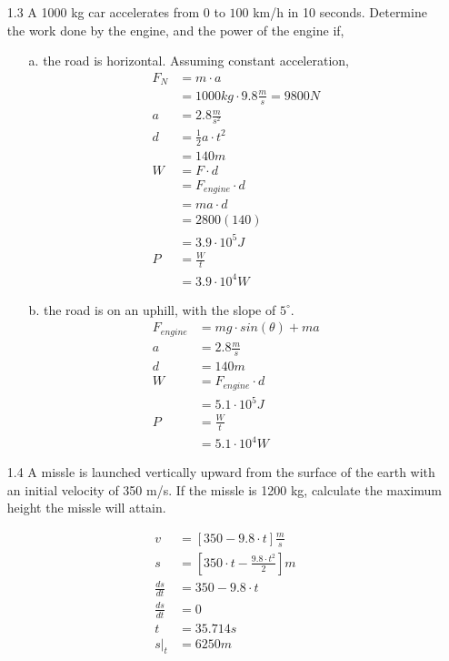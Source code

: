 \documentclass[10pt, a4paper]{article}
\begin{document}
\begin{enumerate}
  \item[1.3] A 1000 kg car accelerates from 0 to $100$ km/h in 10 seconds. Determine the work done by the engine, and the power of the engine if,
    \begin{enumerate}
      \item[a.] the road is horizontal. Assuming constant acceleration,
        \begin{align}
         F_N &= m \cdot a \\
         &= 1000kg \cdot 9.8\frac{m}{s} = 9800 N \\
         a &= 2.8\frac{m}{s^2} \\
         d &= \frac{1}{2}a\cdot t^2 \\
           &= 140 m \\
         W &= F \cdot d \\
           &= F_{engine} \cdot d \\
           &= ma \cdot d \\
           &= 2800(140) \\
           &= 3.9 \cdot 10^5 J \\
         P &= \frac{W}{t} \\
           &= 3.9 \cdot 10^{4} W
       \end{align}

       \setcounter{equation}{0}

      \item[b.] the road is on an uphill, with the slope of $5^{\circ}$.
        \begin{align}
         F_{engine} &= mg\cdot sin(\theta) + ma \\
         a &= 2.8\frac{m}{s} \\
         d &= 140m \\
         W &= F_{engine} \cdot d \\
         &= 5.1 \cdot 10^5 J \\
         P &= \frac{W}{t} \\
          &= 5.1 \cdot 10^4 W
        \end{align}

    \end{enumerate}
  \item[1.4] A missle is launched vertically upward from the surface of the earth with an initial velocity of 350 m/s. If the missle is 1200 kg, calculate the maximum height the missle will attain.

    \setcounter{equation}{0}
    \begin{align}
      v &= [350 - 9.8\cdot t]\frac{m}{s} \\
      s &= [350\cdot t - \frac{9.8\cdot t^2}{2}]m \\
      \frac{ds}{dt} &= 350 - 9.8 \cdot t \\
      \frac{ds}{dt} &= 0 \\
      t &= 35.714 s \\
      s |_{t} &= 6250m
    \end{align}


\end{enumerate}
\end{document}
